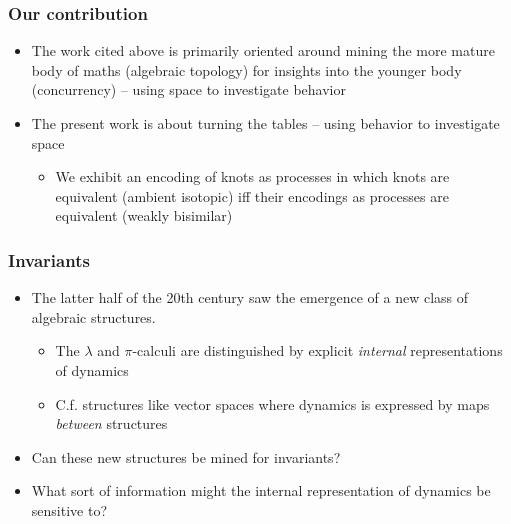 \documentclass{beamer}
\begin{document}
\begin{frame}
  \frametitle{Our contribution}

  \begin{itemize}
  \item The work cited above is primarily oriented around mining the
    more mature body of maths (algebraic topology) for insights into
    the younger body (concurrency) -- using space to investigate behavior
  \item The present work is about turning the tables -- using behavior to investigate space
    \begin{itemize}
    \item We exhibit an encoding of knots as processes in
      which knots are equivalent (ambient isotopic) iff their
      encodings as processes are equivalent (weakly bisimilar)
    \end{itemize}
  \end{itemize}
\end{frame}

\begin{frame}
  \frametitle{Invariants}
  
  \begin{itemize}
  \item The latter half of the 20th century saw the emergence of a new
    class of algebraic structures.
    \begin{itemize}
    \item The $\lambda$ and $\pi$-calculi are distinguished by explicit
      \textit{internal} representations of dynamics
    \item C.f. structures like vector spaces where dynamics is
      expressed by maps \textit{between} structures
    \end{itemize}
  \item Can these new structures be mined for invariants?
  \item What sort of information might the internal representation of
    dynamics be sensitive to?
  \end{itemize}
\end{frame}
\end{document}
